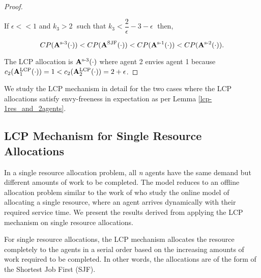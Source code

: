 \documentclass[letterpaper]{article} %
\theoremstyle{definition}
\newenvironment{customlemma}[1]
  {\renewcommand\theinnercustomlemma{#1}\innercustomlemma}
  {\endinnercustomlemma}
\begin{document}
\begin{proof}
\begin{itemize}
\end{itemize}

\noindent If $\epsilon << 1$ and $k_{3} > 2 \;$ such that
$k_{3} < \dfrac{2}{\epsilon} - 3 - \epsilon \;$
then, \\
\begin{linenomath}
\begin{equation*}
    CP(\mathbf{A}^{\textnormal{s-3}}(\cdot)) < CP(\mathbf{A}^{\textnormal{SJF}}(\cdot)) <  CP(\mathbf{A}^{\textnormal{s-1}}(\cdot)) < CP(\mathbf{A}^{\textnormal{s-2}}(\cdot)).\\
\end{equation*}
\end{linenomath}

\noindent The LCP allocation is $\mathbf{A}^{\textnormal{s-3}}(\cdot)$ where agent 2 envies agent 1 because $c_{2}(\mathbf{A}^{\textnormal{LCP}}_{1}(\cdot)) = 1 <  c_{2}(\mathbf{A}^{\textnormal{LCP}}_{2}(\cdot)) = 2 + \epsilon$.

\end{proof}

We study the LCP mechanism in detail for the two cases where the LCP allocations satisfy envy-freeness in expectation as per Lemma \ref{lcp-1res_and_2agents}.

\subsection{LCP Mechanism for Single Resource Allocations} \label{single-resource-lcp}

In a single resource allocation problem, all \textit{n} agents have the same demand but different amounts of work to be completed. The model reduces to  an offline allocation problem similar to the work of \citeauthor{friedman2003fairness}  who study the online model of allocating a single resource, where an agent arrives dynamically with their required service time. We present the results derived from applying the LCP mechanism on single resource allocations.

\begin{customlemma}{A.1} \label{sjf-lcp}
For single resource allocations, the LCP mechanism allocates the resource completely to the agents in a serial order based on the increasing amounts of work required to be completed. In other words, the allocations are of the form of the Shortest Job First (SJF).
\end{customlemma}
\end{document}
